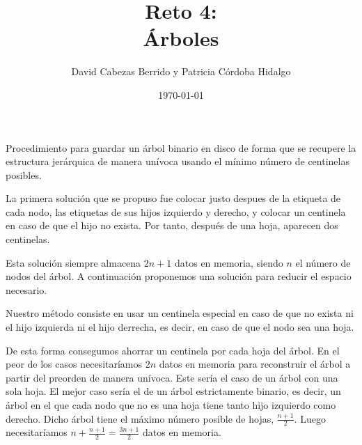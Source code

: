 \documentclass{article}
\begin{document}
\title{Reto 4: \\ Árboles}
\author{David Cabezas Berrido y Patricia Córdoba Hidalgo}
\date{\today}
\maketitle

\begin{justify}
  Procedimiento para guardar un árbol binario en disco de forma que
  se recupere la estructura jerárquica de manera unívoca usando el
  mínimo número de centinelas posibles.
\end{justify}

\begin{justify}
  La primera solución que se propuso fue colocar justo despues de la
  etiqueta de cada nodo, las etiquetas de sus hijos izquierdo y
  derecho, y colocar un centinela en caso de que el hijo no
  exista. Por tanto, después de una hoja, aparecen dos centinelas.
\end{justify}

\begin{justify}
  Esta solución siempre almacena $2n+1$ datos en memoria, siendo $n$
  el número de nodos del árbol. A continuación proponemos una solución
  para reducir el espacio necesario.
\end{justify}

\begin{justify}
  Nuestro método consiste en usar un centinela especial en caso de que
  no exista ni el hijo izquierda ni el hijo derrecha, es decir, en
  caso de que el nodo sea una hoja.
\end{justify}

\begin{justify}
  De esta forma consegumos ahorrar un centinela por cada hoja del
  árbol.  En el peor de los casos necesitaríamos $2n$ datos en memoria
  para reconstruir el árbol a partir del preorden de manera
  unívoca. Este sería el caso de un árbol con una sola hoja. El mejor
  caso sería el de un árbol estrictamente binario, es decir, un árbol
  en el que cada nodo que no es una hoja tiene tanto hijo izquierdo
  como derecho. Dicho árbol tiene el máximo número posible de hojas,
  $\frac{n+1}{2}$. Luego necesitaríamos
  $n+\frac{n+1}{2}=\frac{3n+1}{2}$ datos en memoria.
\end{justify}

\begin{justify}
  
\end{justify}
\end{document}
